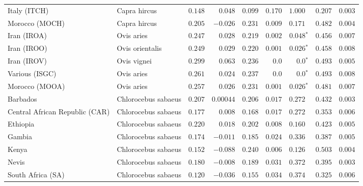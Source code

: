 \begin{center}
\begin{adjustbox}{width = 1\textwidth}
\begin{tabular}{|l|l|r|r|r|r|r|r|r|}
            Italy (ITCH)                    & Capra hircus          & $ 0.148$ & $ 0.048$  & $ 0.099$ & $ 0.170$ & $ 1.000~~$ & $ 0.207$ & $ 0.003$ \\
            Morocco (MOCH)                    & Capra hircus     & $ 0.205$ & $-0.026$  & $ 0.231$ & $ 0.009$ & $ 0.171~~$ & $ 0.482$ & $ 0.004$ \\
            Iran (IROA)                    & Ovis aries         & $ 0.247$ & $ 0.028$  & $ 0.219$ & $ 0.002$    & $\bm{ 0.048{^*}}$    & $ 0.456$ & $ 0.007$ \\
            Iran (IROO)                 & Ovis orientalis          & $ 0.249$ & $ 0.029$  & $ 0.220$ & $ 0.001$    & $\bm{ 0.026{^*}}$    & $ 0.458$ & $ 0.008$ \\
            Iran (IROV)                 & Ovis vignei          & $ 0.299$ & $ 0.063$  & $ 0.236$ & $0.0$ & $\bm{0.0{^*}}$ & $ 0.493$ & $ 0.005$ \\
            Various (ISGC)                       & Ovis aries & $ 0.261$ & $ 0.024$ & $ 0.237$ & $0.0$ & $\bm{0.0{^*}}$        & $ 0.493$ & $ 0.008$ \\
            Morocco (MOOA) & Ovis aries & $ 0.257$ & $ 0.026$  & $ 0.231$ & $ 0.001$ & $\bm{ 0.026{^*}}$ & $ 0.481$ & $ 0.007$ \\
            Barbados                       & Chlorocebus sabaeus & $ 0.207$ & $0.00044$  & $ 0.206$ & $ 0.017$ & $ 0.272~~$        & $ 0.432$ & $ 0.003$ \\
            Central African Republic (CAR)                         & Chlorocebus sabaeus & $ 0.177$ & $ 0.008$  & $ 0.168$ & $ 0.017$ & $ 0.272~~$        & $ 0.353$ & $ 0.006$ \\
            Ethiopia                          & Chlorocebus sabaeus & $ 0.220$ & $ 0.018$  & $ 0.202$ & $ 0.008$ & $ 0.160~~$        & $ 0.423$ & $ 0.005$ \\
            Gambia                          & Chlorocebus sabaeus & $ 0.174$ & $-0.011$  & $ 0.185$ & $ 0.024$ & $ 0.336~~$        & $ 0.387$ & $ 0.005$ \\
            Kenya              & Chlorocebus sabaeus & $ 0.152$ & $-0.088$  & $ 0.240$ & $ 0.006$ & $ 0.126~~$ & $ 0.503$ & $ 0.004$ \\
            Nevis               & Chlorocebus sabaeus & $ 0.180$ & $-0.008$  & $ 0.189$ & $ 0.031$ & $ 0.372~~$ & $ 0.395$ & $ 0.003$ \\
            South Africa (SA)                         & Chlorocebus sabaeus & $ 0.120$ & $-0.036$  & $ 0.155$ & $ 0.034$ & $ 0.374~~$        & $ 0.325$ & $ 0.006$ \\

\end{tabular}
\end{adjustbox}
\end{center}
